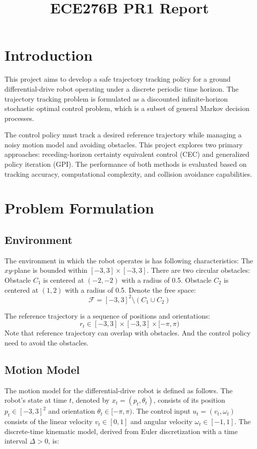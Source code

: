 \documentclass[conference]{IEEEtran}
\begin{document}
\title{ECE276B PR1 Report}

\author{
}

\maketitle

\section{Introduction}
This project aims to develop a safe trajectory tracking policy 
for a ground differential-drive robot operating 
under a discrete periodic time horizon.
The trajectory tracking problem is formulated as a 
discounted infinite-horizon stochastic optimal control problem, 
which is a subset of general Markov decision processes.

The control policy must track a desired reference trajectory 
while managing a noisy motion model and avoiding obstacles. 
This project explores two primary approaches: 
receding-horizon certainty equivalent control (CEC) and generalized policy iteration (GPI). 
The performance of both methods is evaluated based on 
tracking accuracy, computational complexity, and collision avoidance capabilities.


\section{Problem Formulation}
\subsection{Environment}
The environment in which the robot operates is has following characteristics:
The \(xy\)-plane is bounded within \([-3, 3] \times [-3, 3]\).
There are two circular obstacles:
Obstacle \( C_1 \) is centered at \((-2, -2)\) with a radius of 0.5.
Obstacle \( C_2 \) is centered at \((1, 2)\) with a radius of 0.5.
Denote the free space:
\[ \mathcal{F} = [-3, 3]^2 \setminus (C_1 \cup C_2) \]

The reference trajectory is a sequence of positions and orientations:
\[ r_t \in [-3,3] \times [-3,3] \times [-\pi, \pi)\]
Note that reference trajectory can overlap with obstacles.
And the control policy need to avoid the obstacles.

\subsection{Motion Model}
The motion model for the differential-drive robot is defined as follows. 
The robot's state at time \( t \), denoted by 
\( {x}_t = ({p}_t, \theta_t) \), 
consists of its position \( {p}_t \in [-3,3]^2 \) and orientation \( \theta_t \in [-\pi, \pi) \). 
The control input \( {u}_t = (v_t, \omega_t) \) 
consists of the linear velocity \( v_t \in [0,1] \) and 
angular velocity \( \omega_t \in [-1,1] \). 
The discrete-time kinematic model, 
derived from Euler discretization with a time interval \( \Delta > 0 \), is:
\end{document}
